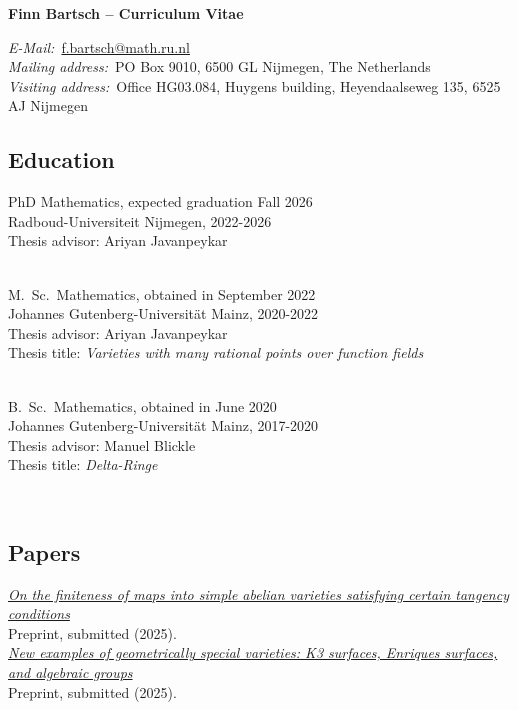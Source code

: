 \documentclass[paper=a4,fontsize=10pt,DIV=10,BCOR=3mm,pdftex]{scrartcl}
\begin{document}
\thispagestyle{empty}
{
\centering
\Large \textbf{Finn Bartsch -- Curriculum Vitae} \par
}
\bigskip \par
\textit{E-Mail:}~\href{mailto:f.bartsch@math.ru.nl}{f.bartsch@math.ru.nl} \\
\textit{Mailing address:}~PO Box 9010, 6500 GL Nijmegen, The Netherlands \\
\textit{Visiting address:}~Office HG03.084, Huygens building, Heyendaalseweg 135, 6525 AJ Nijmegen \\
\par

\subsection*{Education}
PhD Mathematics, expected graduation Fall 2026 \\
Radboud-Universiteit Nijmegen, 2022-2026 \\
Thesis advisor: Ariyan Javanpeykar \\
~\par

M.~Sc.~Mathematics, obtained in September 2022 \\
Johannes Gutenberg-Universität Mainz, 2020-2022 \\
Thesis advisor: Ariyan Javanpeykar \\
Thesis title: \textit{Varieties with many rational points over function fields} \\
~\par

B.~Sc.~Mathematics, obtained in June 2020 \\
Johannes Gutenberg-Universität Mainz, 2017-2020 \\
Thesis advisor: Manuel Blickle \\
Thesis title: \textit{Delta-Ringe}

~\par


\subsection*{Papers}

\href{https://arxiv.org/abs/2502.09414}{\textit{On the finiteness of maps into simple abelian varieties satisfying certain tangency conditions}} \\
Preprint, submitted (2025). \\

\href{https://arxiv.org/abs/2502.09400}{\textit{New examples of geometrically special varieties: K3 surfaces, Enriques surfaces, and algebraic groups}} \\
Preprint, submitted (2025). \\
\end{document}
